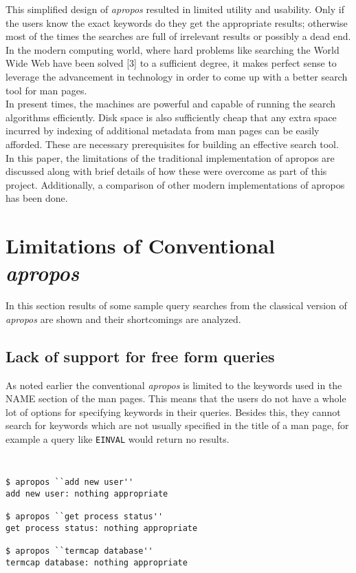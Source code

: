 \documentclass[letterpaper,twocolumn,10pt]{article}
\begin{document}
This simplified design of \textit{apropos} resulted in limited utility and
usability. Only if the users know the exact keywords do they get
the appropriate results; otherwise most of
the times the searches are full of irrelevant results or possibly a dead end. 
In the modern
computing world, where hard problems like searching the World Wide Web have been
solved [3] to a sufficient degree, it makes perfect sense to leverage the
advancement in technology in order to come up with a better search tool for
man pages. \\

In present times, the machines are powerful and  capable of running the search
algorithms efficiently. Disk
space is also sufficiently cheap that any extra space incurred by indexing of
additional metadata from man pages
can be easily afforded. These are necessary prerequisites for building an
effective search tool. \\

In this paper, the limitations of the traditional implementation of apropos
are discussed along with brief details of how these were overcome as part of
this project. Additionally, a comparison of other modern implementations of apropos has been done. \\

\section{Limitations of Conventional \textit{apropos}}
In this section results of some sample query searches from
the classical version of \textit{apropos} are shown and their shortcomings are
analyzed. \\

\subsection{Lack of support for free form queries}
As noted earlier the conventional \textit{apropos} is limited to the keywords
used in the NAME section of the man pages. This means that the users do not have
a whole lot of options for specifying keywords in their queries. Besides this,
they cannot search for keywords which are not usually specified in the title of
a man page, for example a query like {\tt EINVAL} would return no results. \\

{\tt \small
{}
\begin{lstlisting}
$ apropos ``add new user''
add new user: nothing appropriate

$ apropos ``get process status''
get process status: nothing appropriate

$ apropos ``termcap database''
termcap database: nothing appropriate
\end{lstlisting}
}
\end{document}
